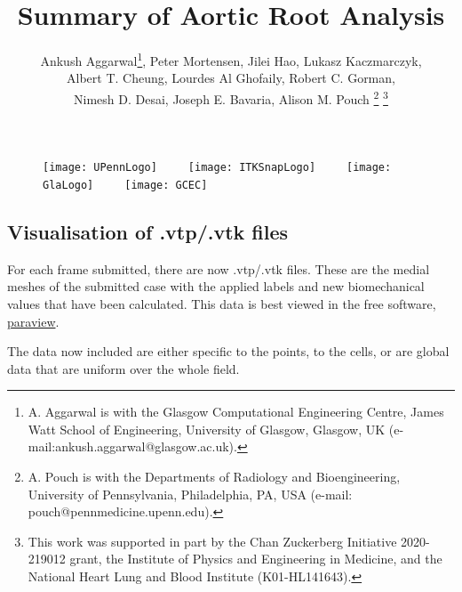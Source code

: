 \documentclass{article}
\title{Summary of Aortic Root Analysis}
\author{Ankush Aggarwal\thanks{A. Aggarwal is with the
Glasgow Computational Engineering Centre, James Watt School of Engineering, University of Glasgow, Glasgow, UK (e-mail:ankush.aggarwal@glasgow.ac.uk). }, Peter Mortensen, Jilei Hao, Lukasz Kaczmarczyk, \\ 
Albert T. Cheung, Lourdes Al Ghofaily, Robert C. Gorman, \\Nimesh D. Desai, Joseph E. Bavaria, Alison M. Pouch \thanks{A. Pouch is with the Departments of Radiology and Bioengineering, University of Pennsylvania, Philadelphia, PA, USA (e-mail: pouch@pennmedicine.upenn.edu).}
%
\thanks{This work was supported in part by the Chan Zuckerberg Initiative 2020-219012 grant, the Institute of Physics and Engineering in Medicine, and the National Heart Lung and Blood Institute (K01-HL141643).}
}
\begin{document}
\maketitle
\begin{figure}[t!]
\texttt{[image: UPennLogo]}~~~~~\texttt{[image: ITKSnapLogo]}~~~~~\texttt{[image: GlaLogo]}~~~~~\texttt{[image: GCEC]}
\end{figure}
\newpage
\subsection*{Visualisation of .vtp/.vtk files}
For each frame submitted, there are now .vtp/.vtk files. These are the medial meshes of the submitted case with the applied labels and new biomechanical values that have been calculated. This data is best viewed in the free software, \href{https://www.paraview.org}{paraview}. 

The data now included are either specific to the points, to the cells, or are global data that are uniform over the whole field.
\end{document}

